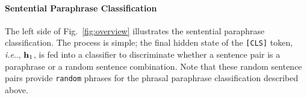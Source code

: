 \documentclass[11pt,a4paper]{article}
\makeatletter
\DeclareRobustCommand\onedot{\futurelet\@let@token\@onedot}
\def\@onedot{\ifx\@let@token.\else.\null\fi\xspace}
\def\ie{\emph{i.e}\onedot} \def\Ie{\emph{I.e}\onedot}
\newcommand{\Fref}[1]{Fig.~\ref{#1}}
\makeatother
\begin{document}
\paragraph{Sentential Paraphrase Classification}
The left side of \Fref{fig:overview} illustrates the sentential paraphrase classification. 
The process is simple; the final hidden state of the {\tt [CLS]} token, \ie, ${\bf h}_1$, is fed into a classifier to discriminate whether a sentence pair is a paraphrase or a random sentence combination. 
Note that these random sentence pairs provide {\tt random} phrases for the phrasal paraphrase classification described above. 


\end{document}
